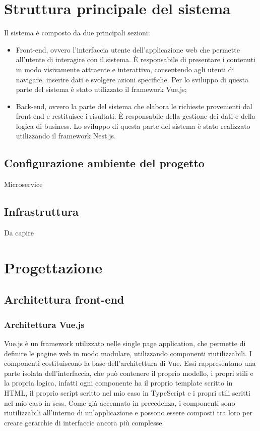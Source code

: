 \section{Struttura principale del sistema}
Il sistema è composto da due principali sezioni:
\begin{itemize}
  \item Front-end, ovvero l'interfaccia utente dell'applicazione web che permette all'utente di interagire con il sistema. È responsabile di presentare i contenuti in modo visivamente attraente e interattivo, consentendo agli utenti di navigare, inserire dati e svolgere azioni specifiche. Per lo
  sviluppo di questa parte del sistema è stato utilizzato il framework Vue.js;
  \item Back-end, ovvero la parte del sistema che elabora le richieste provenienti dal front-end e restituisce i risultati. È responsabile della gestione dei dati e della logica di business.
  Lo sviluppo di questa parte del sistema è stato realizzato utilizzando il framework Nest.js. 
\end{itemize}

\subsection{Configurazione ambiente del progetto}
Microservice
\subsection{Infrastruttura}
Da capire



\section{Progettazione}
\label{sec:progettazione}

\subsection{Architettura front-end}\label{subsec:architettura-front-end}
\subsubsection{Architettura Vue.js}\label{subsubsec:architettura-vue.js}
Vue.js è un framework utilizzato nelle single page application, che permette di definire le pagine web in modo modulare, utilizzando componenti riutilizzabili.
I componenti costituiscono la base dell'architettura di Vue. Essi rappresentano una parte isolata dell'interfaccia, che può contenere il proprio modello, i propri stili e la propria logica, infatti ogni componente ha il proprio
template scritto in HTML, il proprio script scritto nel mio caso in TypeScript e i propri stili scritti nel mio caso in scss.
Come già accennato in precedenza, i componenti sono riutilizzabili all'interno di un'applicazione e possono essere composti tra loro per creare gerarchie di interfaccie ancora più complesse.\\

